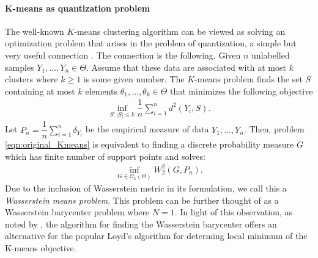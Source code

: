 \paragraph{K-means as quantization problem}
The well-known $K$-means clustering algorithm can be viewed as solving
an optimization problem that arises in the problem of quantization, a simple but very useful connection 
\citep{Pollard-1982, Graf-2000}. The connection is the following.
Given $n$ unlabelled samples $Y_{1},\ldots,Y_{n} \in \Theta$. Assume that these data are associated
with at most $k$ clusters where $k \geq 1$ is some given number. The $K$-means problem finds the set $S$ 
containing at most $k$ elements $\theta_{1},\ldots, \theta_{k} \in \Theta$ that minimizes 
the following objective
\vspace{-6pt}
\begin{eqnarray}
\mathop {\inf }\limits_{S : |S| \leq k}{\dfrac{1}{n}\sum \limits_{i=1}^{n}{d^{2}(Y_{i},S)}}. \label{eqn:original_Kmeans}
\end{eqnarray}
Let $P_{n}=\dfrac{1}{n}\sum \limits_{i=1}^{n}{\delta_{Y_{i}}}$ be the empirical measure of data 
$Y_{1},\ldots,Y_{n}$. Then, problem \eqref{eqn:original_Kmeans} is 
equivalent to finding a discrete probability measure $G$ which has finite 
number of support points and solves:
\vspace{-6pt}
\begin{eqnarray}
\mathop {\inf }\limits_{G \in \mathcal{O}_{k}(\Theta)}{W_{2}^{2}(G,P_{n})}. \label{eqn:Wasserstein_K_means}
\end{eqnarray} 
Due to the inclusion of Wasserstein metric in its formulation, we call this
a \emph{Wasserstein means problem}. This problem can be further thought of as a 
Wasserstein barycenter problem where $N=1$. In light of this observation, as noted by
\citep{Cuturi-2014}, the algorithm for finding the Wasserstein barycenter offers an 
alternative for the popular Loyd's algorithm for determing local minimum of the K-means objective. 

\documentclass{article}
\usepackage[utf8]{inputenc} 
\usepackage{amstext, amsmath,latexsym,amsbsy,amssymb}
\usepackage{hyperref}
\usepackage{amsfonts}
\usepackage[accepted]{icml2017} 
\usepackage{array}
\usepackage{esint}
\usepackage[pdftex]{graphicx}
\usepackage{amsfonts,amsmath,amssymb,amsthm}
\usepackage{epsf}
\usepackage{graphics}
\usepackage{psfrag}
\usepackage{times}
\usepackage{epsfig}
\usepackage{subfig}
\usepackage[titletoc]{appendix}
\usepackage{multirow}
\usepackage{hhline}
\usepackage{color}
\usepackage{bbm}
\usepackage{algorithm}
\usepackage{algorithmic}
\usepackage{booktabs}
\usepackage{hyperref}

